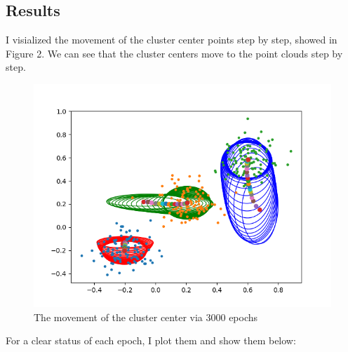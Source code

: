 \documentclass[a4paper]{article}
\begin{document}
\subsection{Results}

I visialized the movement of the cluster center points step by step, showed in Figure 2. We can see that the cluster centers move to the point clouds step by step.

\begin{figure}[!htbp]
\begin{center}
\includegraphics[width=16cm]{imgs/change_learn-2.png}
\end{center}
\caption{The movement of the cluster center via 3000 epochs}\label{changed}
\end{figure}


For a clear status of each epoch, I plot them and show them below:
\end{document}
